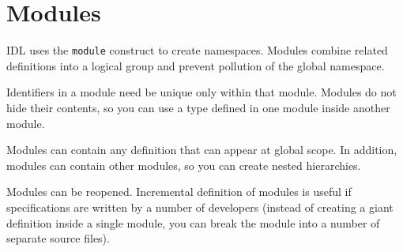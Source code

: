 \section{Modules}
IDL uses the {\tt module} construct to create namespaces.
Modules combine related definitions into a logical group and prevent pollution
of the global namespace.

Identifiers in a module need be unique only within that module.
Modules do not hide their contents, so you can use a type defined in one module
inside another module.

Modules can contain any definition that can appear at global scope.
In addition, modules can contain other modules, so you can create nested
hierarchies. 

Modules can be reopened. 
Incremental definition of modules is useful if specifications are written by a
number of developers (instead of creating a giant definition inside a single
module, you can break the module into a number of separate source files).


\newpage